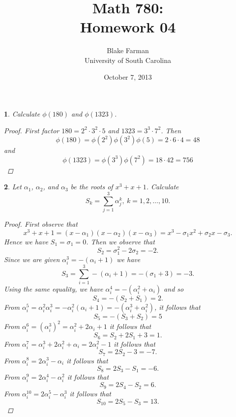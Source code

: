 \documentclass[10pt]{amsart}
\author{Blake Farman\\University of South Carolina}
\title{Math 780:\\Homework 04}
\date{October 7, 2013}
\begin{document}
\maketitle

\providecommand{\p}{\mathfrak{p}}
\providecommand{\m}{\mathfrak{m}}

\newtheorem{thm}{}
\newtheorem{lem}{Lemma}

\begin{thm}\label{ex1}
  Calculate $\phi(180)$ and $\phi(1323)$.
  
  \begin{proof}
    First factor $180 = 2^2 \cdot 3^2 \cdot 5$ and $1323 = 3^3 \cdot 7^2$.
    Then 
    $$\phi(180) = \phi(2^2)\phi(3^2)\phi(5) = 2 \cdot 6 \cdot 4 = 48$$
    and
    $$\phi(1323) = \phi(3^3)\phi(7^2) = 18 \cdot 42 = 756$$
  \end{proof}
\end{thm}

   

\begin{thm}\label{ex3}
  Let $\alpha_1$, $\alpha_2$, and $\alpha_3$ be the roots of $x^3 + x + 1$.
  Calculate 
  $$S_k = \sum_{j=1}^3 \alpha_j^k,\ k = 1, 2, \ldots, 10.$$
  
  \begin{proof}
    First observe that 
    $$x^3 + x + 1 = (x - \alpha_1)(x - \alpha_2)(x - \alpha_3) = x^3 - \sigma_1 x^2 + \sigma_2 x - \sigma_3.$$
    Hence we have $S_1 = \sigma_1 = 0$.
    Then we observe that
    $$S_2 = \sigma_1^2 - 2\sigma_2 = -2.$$
    Since we are given $\alpha_i^3 = -(\alpha_i + 1)$ we have
    $$S_3 = \sum_{i=1}^3 -(\alpha_i + 1) = -(\sigma_1 + 3) = -3.$$
    Using the same equality, we have $\alpha_i^4 = -(\alpha_i^2 + \alpha_i)$ and so
    $$S_4 = -(S_2 + S_1) = 2.$$
    From $\alpha_i^5 = \alpha_i^2\alpha_i^3 = -\alpha_i^2(\alpha_i + 1) = -(\alpha_i^3 + \alpha_i^2)$, it follows that
    $$S_5 = -(S_3 + S_2) = 5$$
    From $\alpha_i^6 = (\alpha_i^3)^2 = \alpha_i^2 + 2\alpha_i + 1$ it follows that
    $$S_6 = S_2 + 2S_1 + 3 = 1.$$
    From $\alpha_i^7 = \alpha_i^3 + 2\alpha_i^2 + \alpha_i = 2\alpha_i^2 - 1$ it follows that
    $$S_7 = 2S_2 - 3 = -7.$$
    From $\alpha_i^8 = 2\alpha_i^3 - \alpha_i$ it follows that
    $$S_8 = 2S_3 - S_1 = -6.$$
    From $\alpha_i^9 = 2\alpha_i^4 - \alpha_i^2$ it follows that
    $$S_9 = 2S_4 - S_2 = 6.$$
    From $\alpha_i^{10} = 2\alpha_i^5 - \alpha_i^3$ it follows that
    $$S_{10} = 2S_5 - S_3 = 13.$$
  \end{proof}
\end{thm}
\end{document}
